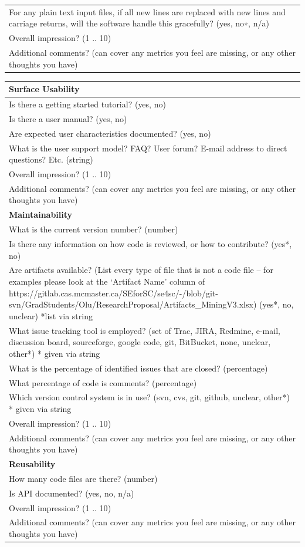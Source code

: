 \documentclass[12pt, notitlepage]{article}
\begin{document}
\begin{singlespace}
\begin{tabular}{p{16cm}}
	For any plain text input files, if all new lines are replaced with new lines and carriage returns, will the software handle this gracefully? ({yes, no∗, n/a})\\
	Overall impression? ({1 .. 10})\\
	Additional comments? (can cover any metrics you feel are missing, or any other thoughts you have)\\
	\hline
\end{tabular}

\def\arraystretch{1.4}
\begin{tabular}{p{16cm}}
	\hline		
	\textbf{Surface Usability}\\
	\hline
	Is there a getting started tutorial? ({yes, no})\\
	Is there a user manual? ({yes, no})\\
	Are expected user characteristics documented? ({yes, no})\\
	What is the user support model? FAQ? User forum? E-mail address to direct questions? Etc. (string)\\
	Overall impression? ({1 .. 10})\\
	Additional comments? (can cover any metrics you feel are missing, or any other thoughts you have)\\
	\hline	
	\textbf{Maintainability}\\
	\hline
	What is the current version number? (number)\\
	Is there any information on how code is reviewed, or how to contribute? ({yes*, no})\\
	Are artifacts available? (List every type of file that is not a code file – for examples please look at the ‘Artifact Name’ column of https://gitlab.cas.mcmaster.ca/SEforSC/se4sc/-/blob/git-svn/GradStudents/Olu/ResearchProposal/Artifacts\_MiningV3.xlsx) ({yes*, no, unclear}) *list via string\\
	What issue tracking tool is employed? (set of {Trac, JIRA, Redmine, e-mail, discussion board, sourceforge, google code, git, BitBucket, none, unclear, other*}) * given via string\\
	What is the percentage of identified issues that are closed? (percentage)\\
	What percentage of code is comments? (percentage)\\
	Which version control system is in use? ({svn, cvs, git, github, unclear, other*}) * given via string\\
	Overall impression? ({1 .. 10})\\
	Additional comments? (can cover any metrics you feel are missing, or any other thoughts you have)\\
	\hline		
	\textbf{Reusability}\\
	\hline
	How many code files are there? (number)\\
	Is API documented? ({yes, no, n/a})\\
	Overall impression? ({1 .. 10})\\
	Additional comments? (can cover any metrics you feel are missing, or any other thoughts you have)\\
	\hline
\end{tabular}


\end{singlespace}
\end{document}

